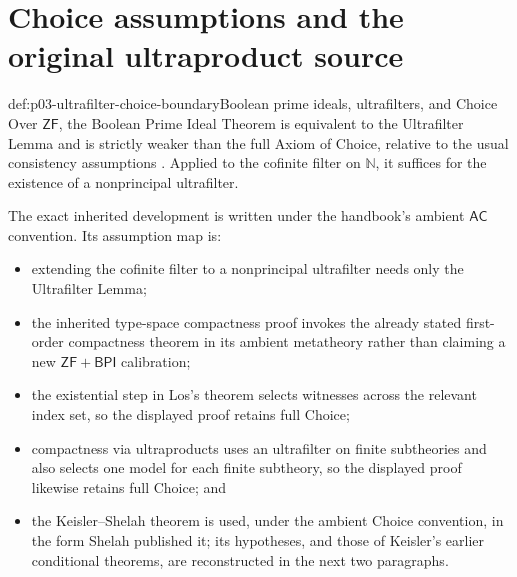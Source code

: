 \section*{Choice assumptions and the original ultraproduct source}

\begin{proofboundary}{def:p03-ultrafilter-choice-boundary}{Boolean prime ideals, ultrafilters, and Choice}
Over \(\mathsf{ZF}\), the Boolean Prime Ideal Theorem is equivalent to the
Ultrafilter Lemma and is strictly weaker than the full Axiom of Choice, relative
to the usual consistency assumptions \cite{HowardRubin1998}.  Applied to the
cofinite filter on \(\mathbb N\), it suffices for the existence of a
nonprincipal ultrafilter.

The exact inherited development is written under the handbook's ambient
\(\mathsf{AC}\) convention.  Its assumption map is:
\begin{itemize}
  \item extending the cofinite filter to a nonprincipal ultrafilter needs only
        the Ultrafilter Lemma;
  \item the inherited type-space compactness proof invokes the already stated
        first-order compactness theorem in its ambient metatheory rather than
        claiming a new \(\mathsf{ZF}+\mathsf{BPI}\) calibration;
  \item the existential step in Los's theorem selects witnesses across the
        relevant index set, so the displayed proof retains full Choice;
  \item compactness via ultraproducts uses an ultrafilter on finite subtheories
        and also selects one model for each finite subtheory, so the displayed
        proof likewise retains full Choice; and
  \item the Keisler--Shelah theorem is used, under the ambient Choice
        convention, in the form Shelah published it; its hypotheses, and
        those of Keisler's earlier conditional theorems, are reconstructed in
        the next two paragraphs.
\end{itemize}


\end{proofboundary}
